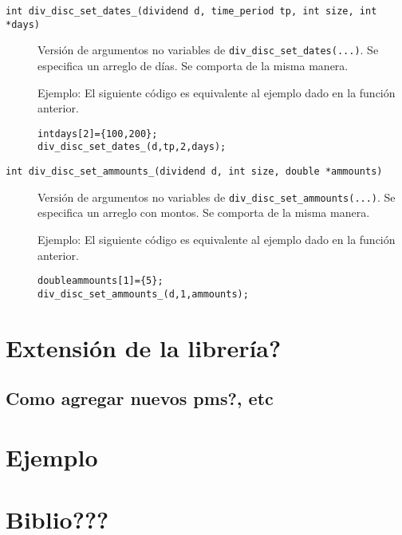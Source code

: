 \documentclass[12pt,a4paper,final]{article}
\begin{document}
\begin{description}
				\item [\texttt{int div\_disc\_set\_dates\_(dividend d, time\_period tp, int size, int *days)}]
					Versión de argumentos no variables de \texttt{div\_disc\_set\_dates(...)}.
					Se especifica un arreglo de días.
					Se comporta de la misma manera.
									
					Ejemplo: El siguiente código es equivalente al ejemplo dado en la función anterior.
						\begin{alltt}
							int days[2] = \{ 100, 200 \};
							div\_disc\_set\_dates\_(d, tp, 2, days);
						\end{alltt}				
				
				
				\item [\texttt{int div\_disc\_set\_ammounts\_(dividend d, int size, double *ammounts)}]
					Versión de argumentos no variables de \texttt{div\_disc\_set\_ammounts(...)}.
					Se especifica un arreglo con montos.
					Se comporta de la misma manera.	
					
					Ejemplo: El siguiente código es equivalente al ejemplo dado en la función anterior.
						\begin{alltt}
							double ammounts[1] = \{ 5 \};
							div\_disc\_set\_ammounts\_(d, 1, ammounts);
						\end{alltt}										
			\end{description}
			
\section{Extensión de la librería?}
	\subsection{Como agregar nuevos pms?, etc}

\section{Ejemplo}

\section{Biblio???}

\printindex
\end{document}
